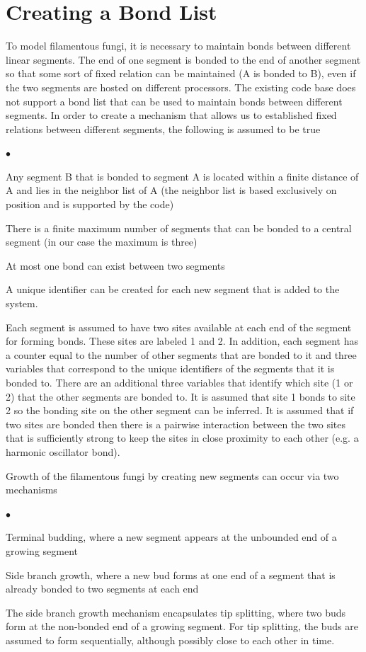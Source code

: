 \documentclass[12pt]{article}
\begin{document}
\section{Creating a Bond List}
To model filamentous fungi, it is necessary to maintain bonds between
different linear segments. The end of one segment is bonded to the end of another
segment so that some sort of fixed relation can be maintained (A is bonded to B),
even if the two segments are hosted on different processors. The existing code
base does not support a bond list that can be used to maintain bonds
between different segments. In order to create a mechanism that allows us to
established fixed relations between different segments, the following is assumed
to be true
\begin{list}{$\bullet$}{}
\item Any segment B that is bonded to segment A is located within a finite
distance of A and lies in the neighbor list of A (the neighbor list is based
exclusively on position and is supported by the code)
\item There is a finite maximum number of segments that can be bonded to a
central segment (in our case the maximum is three)
\item At most one bond can exist between two segments
\item A unique identifier can be created for each new segment that is added to the
system.
\end{list}

Each segment is assumed to have two sites available at each end of the segment for
forming bonds. These sites are labeled 1 and 2. In addition, each segment has
a counter equal to the number of other segments that are bonded to it and three
variables that correspond to the unique identifiers of the segments that it is
bonded to. There are an additional three variables that identify which site (1 or
2) that the other segments are bonded to. It is assumed that site 1 bonds to site
2 so the bonding site on the other segment can be inferred. It is assumed that if
two sites are bonded then there is a pairwise interaction between the two sites
that is sufficiently strong to keep the sites in close proximity to each other (e.g.
a harmonic oscillator bond).

Growth of the filamentous fungi by creating new segments can occur via two mechanisms
\begin{list}{$\bullet$}{}
\item Terminal budding, where a new segment appears at the unbounded end of a
growing segment
\item Side branch growth, where a new bud forms at one end of a segment that is
already bonded to two segments at each end
\end{list}
The side branch growth mechanism encapsulates tip splitting, where two buds form
at the non-bonded end of a growing segment. For tip splitting, the buds are assumed
to form sequentially, although possibly close to each other in time.
\end{document}
